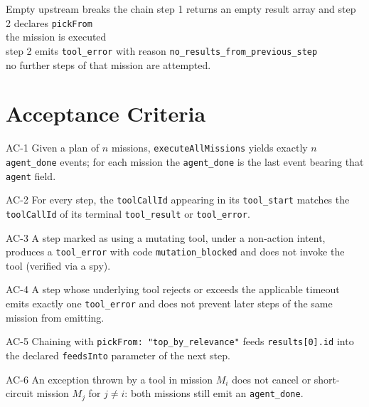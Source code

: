 \begin{scenario}{Empty upstream breaks the chain}
\Given step 1 returns an empty result array and step 2 declares \texttt{pickFrom} \\
\When the mission is executed \\
\Then step 2 emits \texttt{tool\_error} with reason \texttt{no\_results\_from\_previous\_step} \\
\And no further steps of that mission are attempted.
\end{scenario}

\section{Acceptance Criteria}

\begin{ac}{AC-1}
Given a plan of $n$ missions, \texttt{executeAllMissions} yields exactly $n$ \texttt{agent\_done} events; for each mission the \texttt{agent\_done} is the last event bearing that \texttt{agent} field.
\end{ac}

\begin{ac}{AC-2}
For every step, the \texttt{toolCallId} appearing in its \texttt{tool\_start} matches the \texttt{toolCallId} of its terminal \texttt{tool\_result} or \texttt{tool\_error}.
\end{ac}

\begin{ac}{AC-3}
A step marked as using a mutating tool, under a non-action intent, produces a \texttt{tool\_error} with code \texttt{mutation\_blocked} and does not invoke the tool (verified via a spy).
\end{ac}

\begin{ac}{AC-4}
A step whose underlying tool rejects or exceeds the applicable timeout emits exactly one \texttt{tool\_error} and does not prevent later steps of the same mission from emitting.
\end{ac}

\begin{ac}{AC-5}
Chaining with \texttt{pickFrom: "top\_by\_relevance"} feeds \texttt{results[0].id} into the declared \texttt{feedsInto} parameter of the next step.
\end{ac}

\begin{ac}{AC-6}
An exception thrown by a tool in mission $M_i$ does not cancel or short-circuit mission $M_j$ for $j \neq i$: both missions still emit an \texttt{agent\_done}.
\end{ac}

